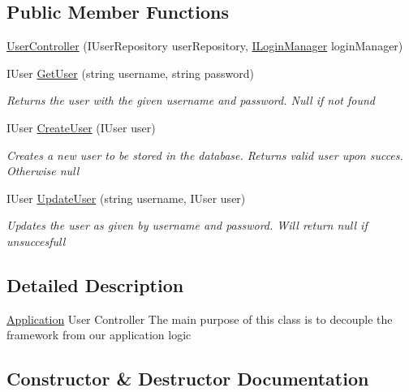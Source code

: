 \subsection*{Public Member Functions}
\begin{DoxyCompactItemize}
\item 
\mbox{\hyperlink{class_application_1_1_controllers_1_1_user_controller_aedfae5fded8199d832e92294b088e418}{User\+Controller}} (I\+User\+Repository user\+Repository, \mbox{\hyperlink{interface_application_1_1_interfaces_1_1_i_login_manager}{I\+Login\+Manager}} login\+Manager)
\item 
I\+User \mbox{\hyperlink{class_application_1_1_controllers_1_1_user_controller_adb2565915559692fae6a146d23d5fe01}{Get\+User}} (string username, string password)
\begin{DoxyCompactList}\small\item\em Returns the user with the given username and password. Null if not found \end{DoxyCompactList}\item 
I\+User \mbox{\hyperlink{class_application_1_1_controllers_1_1_user_controller_abf08955a5adc363fa137399a961a14fc}{Create\+User}} (I\+User user)
\begin{DoxyCompactList}\small\item\em Creates a new user to be stored in the database. Returns valid user upon succes. Otherwise null \end{DoxyCompactList}\item 
I\+User \mbox{\hyperlink{class_application_1_1_controllers_1_1_user_controller_af509b1d73f3a654edfb48dcc1f623ca8}{Update\+User}} (string username, I\+User user)
\begin{DoxyCompactList}\small\item\em Updates the user as given by username and password. Will return null if unsuccesfull \end{DoxyCompactList}\end{DoxyCompactItemize}


\subsection{Detailed Description}
\mbox{\hyperlink{namespace_application}{Application}} User Controller The main purpose of this class is to decouple the framework from our application logic 



\subsection{Constructor \& Destructor Documentation}
\mbox{\label{class_application_1_1_controllers_1_1_user_controller_aedfae5fded8199d832e92294b088e418}} 
